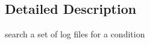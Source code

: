 \subsection{Detailed Description}
\begin{DoxyVerb}search a set of log files for a condition
\end{DoxyVerb}
 